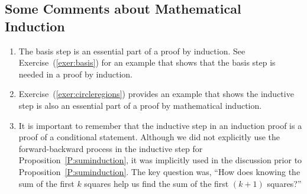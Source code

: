 \subsection*{Some Comments about Mathematical Induction}
\setcounter{equation}{0}
\begin{enumerate}
\item The basis step is an essential part of a proof by induction.  See 
Exercise~(\ref{exer:basis}) for an example that shows that the basis step is needed in a proof by induction.


\item Exercise~(\ref{exer:circleregions}) provides an example that shows the inductive step is also an essential part of a proof by mathematical induction.

\item It is important to remember that the inductive step in an induction proof is a proof of a conditional statement.  Although we did not explicitly use the forward-backward process in the inductive step for Proposition~\ref{P:suminduction}, it was implicitly used in the discussion prior to Proposition~\ref{P:suminduction}.  The key question was, ``How does knowing the sum of the first  $k$  squares help us find the sum of the first  $\left( {k + 1} \right)$
 squares?''



\end{enumerate}
